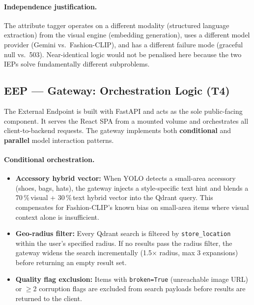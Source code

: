 \documentclass[12pt]{article}
\begin{document}
\paragraph{Independence justification.} The attribute tagger operates on a different modality (structured language extraction) from the visual engine (embedding generation), uses a different model provider (Gemini vs.\ Fashion-CLIP), and has a different failure mode (graceful null vs.\ 503). Near-identical logic would not be penalised here because the two IEPs solve fundamentally different subproblems.

\subsection{EEP --- Gateway: Orchestration Logic (T4)}

The External Endpoint is built with FastAPI and acts as the sole public-facing component. It serves the React SPA from a mounted volume and orchestrates all client-to-backend requests. The gateway implements both \textbf{conditional} and \textbf{parallel} model interaction patterns.

\paragraph{Conditional orchestration.}
\begin{itemize}[leftmargin=*]
  \item \textbf{Accessory hybrid vector:} When YOLO detects a small-area accessory (shoes, bags, hats), the gateway injects a style-specific text hint and blends a 70\,\%\,visual + 30\,\%\,text hybrid vector into the Qdrant query. This compensates for Fashion-CLIP's known bias on small-area items where visual context alone is insufficient.
  \item \textbf{Geo-radius filter:} Every Qdrant search is filtered by \texttt{store\_location} within the user's specified radius. If no results pass the radius filter, the gateway widens the search incrementally (1.5$\times$ radius, max 3 expansions) before returning an empty result set.
  \item \textbf{Quality flag exclusion:} Items with \texttt{broken=True} (unreachable image URL) or $\ge$2 corruption flags are excluded from search payloads before results are returned to the client.
\end{itemize}
\end{document}
